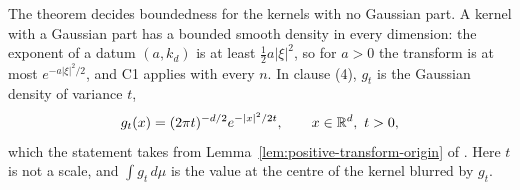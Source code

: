 The theorem decides boundedness for the kernels with no Gaussian part. A kernel with a Gaussian
part has a bounded smooth density in every dimension: the exponent of a datum $(a,k_d)$ is at
least $\tfrac12 a|\xi|^2$, so for $a > 0$ the transform is at most $e^{-a|\xi|^2/2}$, and C1
applies with every $n$. In clause (4), $g_t$ is the Gaussian density of variance $t$,
\[
  g_t(x) = (2\pi t)^{-d/2}e^{-|x|^2/2t} , \qquad x \in \mathbb{R}^d ,\ t > 0 ,
\]
which the statement takes from Lemma~\ref{lem:positive-transform-origin} of \suppl. Here $t$ is
not a scale, and $\int g_t\,d\mu$ is the value at the centre of the kernel blurred by $g_t$.

